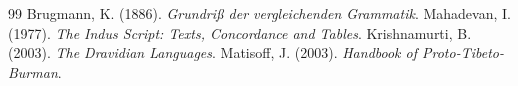 \documentclass[11pt,twocolumn,letterpaper]{article}
\begin{document}
\begin{thebibliography}{99}
\small
{} Brugmann, K. (1886). \textit{Grundriß der vergleichenden Grammatik}.
 Mahadevan, I. (1977). \textit{The Indus Script: Texts, Concordance and Tables}.
 Krishnamurti, B. (2003). \textit{The Dravidian Languages}.
 Matisoff, J. (2003). \textit{Handbook of Proto-Tibeto-Burman}.
\end{thebibliography}
\end{document}
